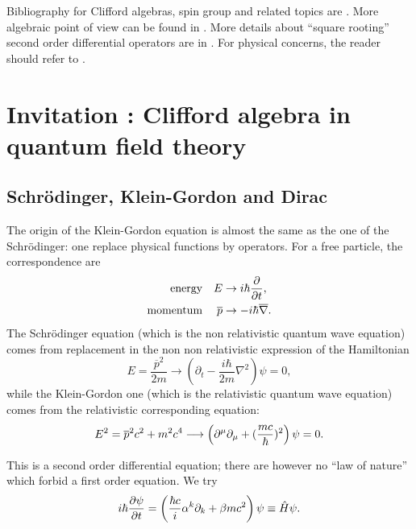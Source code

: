 
Bibliography for Clifford algebras, spin group and related topics are \cite{memP,Michelson,Witkowski,mellor,ResEtaDiracType}. More algebraic point of view  can be found in \cite{Fult,Chevalley}. More details about ``square rooting'' second order differential operators are in \cite{Bronn}. For physical concerns, the reader should refer to \cite{Weinberg,Peskin,schwabl}. 

\section{Invitation : Clifford algebra in quantum field theory}

\label{Secqft}
\subsection{Schrödinger, Klein-Gordon and Dirac}

The origin of the Klein-Gordon equation is almost the same as the one of the Schrödinger: one replace physical functions by operators. For a free particle, the correspondence are
\begin{align*}
 \textrm{energy}&& E&\rightarrow i\hbar\frac{\partial }{\partial t},\\
 \textrm{momentum}&& \overline{p}&\rightarrow -i\hbar\overline{ \nabla }.
\end{align*}
The Schrödinger equation (which is the non relativistic quantum wave equation) comes from replacement in the non non relativistic expression of the Hamiltonian
\[
E=\frac{\overline{p}^2}{2m}\longrightarrow\left(\partial_t-\frac{i\hbar}{2m}\nabla^2\right)\psi=0,
\]
while the Klein-Gordon one (which is the relativistic quantum wave equation) comes from the relativistic corresponding equation:
\[
E^2=\overline{p}^2c^2+m^2c^4\longrightarrow\left(\partial^{\mu}\partial_{\mu}+(\frac{mc}{\hbar})^2\right)\psi=0.
\]

This is a second order differential equation; there are however no ``law of nature''{} which forbid a first order equation. We try
\[
 i\hbar\frac{\partial \psi}{\partial t}
 =\left(\frac{\hbar c}{i}\alpha^k\partial_k+\beta mc^2\right)\psi\equiv \hat{H}\psi.
\]

